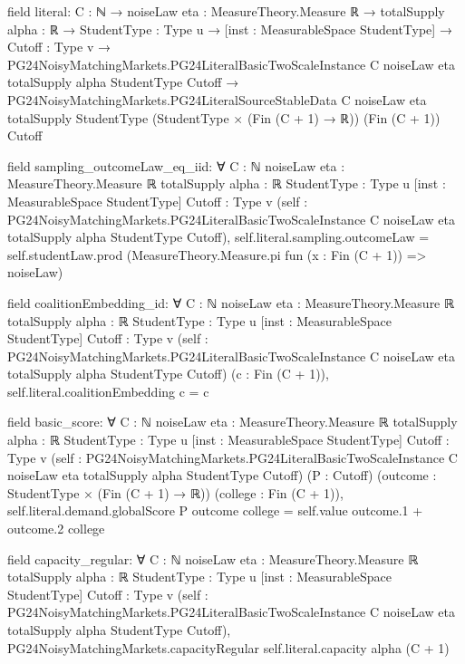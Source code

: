 \documentclass[10pt]{article}
\begin{document}
\begin{ReviewVerbatim}
field literal:
{C : ℕ} →
  {noiseLaw eta : MeasureTheory.Measure ℝ} →
    {totalSupply alpha : ℝ} →
      {StudentType : Type u} →
        [inst : MeasurableSpace StudentType] →
          {Cutoff : Type v} →
            PG24NoisyMatchingMarkets.PG24LiteralBasicTwoScaleInstance C noiseLaw eta totalSupply alpha StudentType
                Cutoff →
              PG24NoisyMatchingMarkets.PG24LiteralSourceStableData C noiseLaw eta totalSupply StudentType
                (StudentType × (Fin (C + 1) → ℝ)) (Fin (C + 1)) Cutoff

field sampling_outcomeLaw_eq_iid:
∀ {C : ℕ} {noiseLaw eta : MeasureTheory.Measure ℝ} {totalSupply alpha : ℝ} {StudentType : Type u}
  [inst : MeasurableSpace StudentType] {Cutoff : Type v}
  (self :
    PG24NoisyMatchingMarkets.PG24LiteralBasicTwoScaleInstance C noiseLaw eta totalSupply alpha StudentType Cutoff),
  self.literal.sampling.outcomeLaw = self.studentLaw.prod (MeasureTheory.Measure.pi fun (x : Fin (C + 1)) => noiseLaw)

field coalitionEmbedding_id:
∀ {C : ℕ} {noiseLaw eta : MeasureTheory.Measure ℝ} {totalSupply alpha : ℝ} {StudentType : Type u}
  [inst : MeasurableSpace StudentType] {Cutoff : Type v}
  (self : PG24NoisyMatchingMarkets.PG24LiteralBasicTwoScaleInstance C noiseLaw eta totalSupply alpha StudentType Cutoff)
  (c : Fin (C + 1)), self.literal.coalitionEmbedding c = c

field basic_score:
∀ {C : ℕ} {noiseLaw eta : MeasureTheory.Measure ℝ} {totalSupply alpha : ℝ} {StudentType : Type u}
  [inst : MeasurableSpace StudentType] {Cutoff : Type v}
  (self : PG24NoisyMatchingMarkets.PG24LiteralBasicTwoScaleInstance C noiseLaw eta totalSupply alpha StudentType Cutoff)
  (P : Cutoff) (outcome : StudentType × (Fin (C + 1) → ℝ)) (college : Fin (C + 1)),
  self.literal.demand.globalScore P outcome college = self.value outcome.1 + outcome.2 college

field capacity_regular:
∀ {C : ℕ} {noiseLaw eta : MeasureTheory.Measure ℝ} {totalSupply alpha : ℝ} {StudentType : Type u}
  [inst : MeasurableSpace StudentType] {Cutoff : Type v}
  (self :
    PG24NoisyMatchingMarkets.PG24LiteralBasicTwoScaleInstance C noiseLaw eta totalSupply alpha StudentType Cutoff),
  PG24NoisyMatchingMarkets.capacityRegular self.literal.capacity alpha (C + 1)
\end{ReviewVerbatim}
\end{document}
